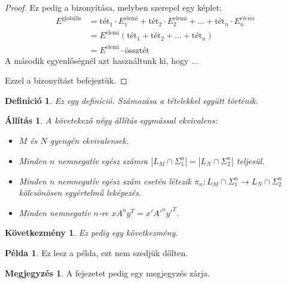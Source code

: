 \documentclass[12pt]{report}
\newtheorem{defi}[tét]{Definíció}
\newtheorem{áll}[tét]{Állítás}
\newtheorem{köv}[tét]{Következmény}
\theoremstyle{definition}
\newtheorem{megj}[tét]{Megjegyzés}
\newtheorem{pld}[tét]{Példa}
\begin{document}
\begin{proof}
Ez pedig a bizonyítása, melyben szerepel egy képlet:
\begin{equation}
\begin{split}
E^{\text{globális}} &= \text{tét}_1\cdot E_1^{\text{elemi}}+\text{tét}_2\cdot
E_2^{\text{elemi}}+\ldots+\text{tét}_n\cdot E_n^{elemi} \\
&=E^{\text{elemi}}\left(\text{tét}_1+\text{tét}_2+\ldots+\text{tét}_n\right)\\
&=E^{\text{elemi}}\cdot\text{össztét}
\end{split}
\end{equation}
A második egyenlőségnél azt használtunk ki, hogy ...

Ezzel a bizonyítást befejeztük.
\end{proof}

\begin{defi}
\label{def-pelda}
Ez egy definíció. Számozása a tételekkel együtt történik.
\end{defi}

\begin{áll}
A követekező négy állítás egymással ekvivalens:
\label{áll-ekvivalencia}
  \begin{itemize}
  \item[(i)] $M$ és $N$ gyengén ekvivalensek.
  \item[(ii)] Minden $n$
  nemnegatív egész számra $|L_{M}\cap \Sigma_{1}^{n}|=|L_{N}\cap \Sigma_{2}^{n}|$ teljesül.
  \item[(iii)] Minden $n$ nemnegatív egész szám esetén
   létezik
  $ \pi_{n}: L_{M}\cap \Sigma_{1}^{n} \rightarrow L_{N}\cap \Sigma_{2}^{n} $ kölcsönösen egyértelmű
  leképezés.
  \item[(iv)] Minden nemnegatív $n$-re $x A^{n} y^{T}=x' A'^{n} y'^{T}$.
  \end{itemize}
\end{áll}

\begin{köv}
  Ez pedig egy következmény.
\end{köv}

\begin{pld}
  Ez lesz a példa, ezt nem szedjük dőlten.
\end{pld}

\begin{megj}
  A fejezetet pedig egy megjegyzés zárja.
\end{megj}
\end{document}
